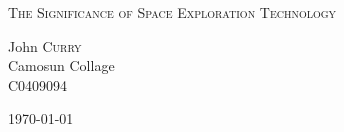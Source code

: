 \begin{titlepage}
\begin{center}
\vfill
\textsc{\huge The Significance of Space Exploration Technology}\\[1.5cm]
\begin{minipage}{0.4\textwidth}
\begin{flushleft} \large
John \textsc{Curry}\\
Camosun Collage\\
C0409094
\end{flushleft}
\end{minipage}
\vfill
{\large \today}
\end{center}
\end{titlepage}

